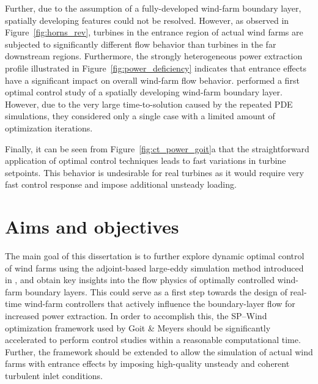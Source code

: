 Further, due to the assumption of a fully-developed wind-farm boundary layer, spatially developing features could not be resolved. However, as observed in Figure~\ref{fig:horns_rev}, turbines in the entrance region of actual wind farms are subjected to significantly different flow behavior than turbines in the far downstream regions. Furthermore, the strongly heterogeneous power extraction profile illustrated in Figure~\ref{fig:power_deficiency} indicates that entrance effects have a significant impact on overall wind-farm flow behavior. \cite{goit2016optimal} performed a first optimal control study of a spatially developing wind-farm boundary layer. However, due to the very large time-to-solution caused by the repeated PDE simulations, they considered only a single case with a limited amount of optimization iterations. 
%

Finally, it can be seen from Figure~\ref{fig:ct_power_goit}a that the straightforward application of optimal control techniques leads to fast variations in turbine setpoints. This behavior is undesirable for real turbines as it would require very fast control response and impose additional unsteady loading.

\section{Aims and objectives}\label{sec:intro_aims}
The main goal of this dissertation is to further explore dynamic optimal control of wind farms using the adjoint-based large-eddy simulation method introduced in \cite{goit2015optimal}, and obtain key insights into the flow physics of optimally controlled wind-farm boundary layers. This could serve as a first step towards the design of real-time wind-farm controllers that actively influence the boundary-layer flow for increased power extraction. In order to accomplish this, the SP--Wind optimization framework used by Goit \& Meyers should be significantly accelerated to perform control studies within a reasonable computational time. Further, the framework should be extended to allow the simulation of actual wind farms with entrance effects by imposing high-quality unsteady and coherent turbulent inlet conditions. 

